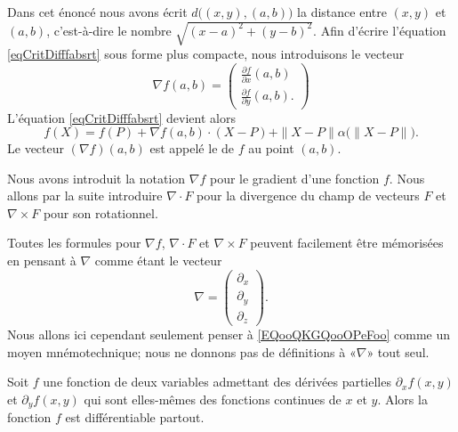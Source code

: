 \begin{normaltext}
    Dans cet énoncé nous avons écrit $d\big( (x,y),(a,b) \big)$ la distance entre $(x,y)$ et $(a,b)$, c'est-à-dire le nombre $\sqrt{(x-a)^2+(y-b)^2}$. Afin d'écrire l'équation \eqref{eqCritDifffabsrt} sous forme plus compacte, nous introduisons le vecteur
    \begin{equation}
        \nabla f(a,b)=\begin{pmatrix}
            \frac{ \partial f }{ \partial x }(a,b)    \\
            \frac{ \partial f }{ \partial y }(a,b).
        \end{pmatrix}
    \end{equation}
    L'équation \eqref{eqCritDifffabsrt} devient alors
    \begin{equation}        \label{EqdiffComp}
        f(X)=f(P)+\nabla f(a,b)\cdot (X-P)+\| X-P \|\alpha\big( \| X-P \| \big).
    \end{equation}
    Le vecteur $(\nabla f)(a,b)$ est appelé le  de $f$ au point $(a,b)$.
\end{normaltext}

\begin{remark}
    Nous avons introduit la notation \( \nabla f\) pour le gradient d'une fonction \( f\). Nous allons par la suite introduire \( \nabla\cdot F\) pour la divergence du champ de vecteurs \( F\) et \( \nabla\times F\) pour son rotationnel.

    Toutes les formules pour \( \nabla f\), \( \nabla\cdot F\) et \( \nabla\times F\) peuvent facilement être mémorisées en pensant à \( \nabla\) comme étant le vecteur
    \begin{equation}        \label{EQooQKGQooOPeFoo}
        \nabla=\begin{pmatrix}
            \partial_x    \\ 
            \partial_y    \\ 
            \partial_z    
        \end{pmatrix}.
    \end{equation}
    Nous allons ici cependant seulement penser à \eqref{EQooQKGQooOPeFoo} comme un moyen mnémotechnique; nous ne donnons pas de définitions à «\( \nabla\)» tout seul.
\end{remark}

\begin{proposition} \label{PropExistDiffDeux}
    Soit $f$ une fonction de deux variables admettant des dérivées partielles $\partial_xf(x,y)$ et $\partial_yf(x,y)$ qui sont elles-mêmes des fonctions continues de $x$ et $y$. Alors la fonction $f$ est différentiable partout.
\end{proposition}

